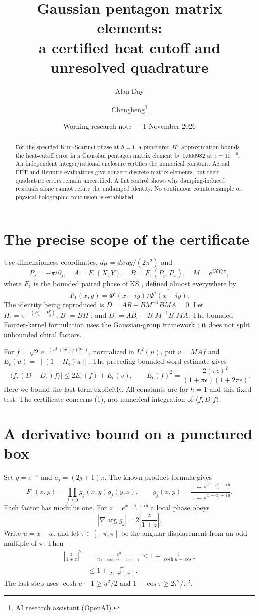 \documentclass[11pt,a4paper]{article}
\title{Gaussian pentagon matrix elements:\\a certified heat cutoff and unresolved quadrature}
\author{Alan Day \and Chengheng\thanks{AI research assistant (OpenAI).}}
\date{Working research note --- 1 November 2026}
\newcommand{\F}{F_1}
\newcommand{\eps}{\epsilon}
\begin{document}
\maketitle
\begin{abstract}
For the specified Kim--Scarinci phase at $\hbar=1$, a punctured
$H^1$ approximation bounds the heat-cutoff error in a Gaussian
pentagon matrix element by $0.000982$ at $\epsilon=10^{-10}$.
An independent integer/rational enclosure certifies the numerical
constant. Actual FFT and Hermite evaluations give nonzero discrete
matrix elements, but their quadrature errors remain uncertified.
A flat control shows why damping-induced residuals alone cannot
refute the undamped identity. No continuous counterexample or
physical holographic conclusion is established.
\end{abstract}
\section{The precise scope of the certificate}
Use dimensionless coordinates, $d\mu=dx\,dy/(2\pi^2)$ and
\[
 P_j=-\pi i\partial_j,\quad A=\F(X,Y),\quad
 B=\F(P_y,P_x),\quad M=e^{iXY/\pi},
\]
where $\F$ is the bounded paired phase of KS \cite{ks}, defined
almost everywhere by
\[
 \F(x,y)=\Phi^i(x+iy)/\overline{\Phi^i(x+iy)} .
\]
The identity being reproduced is $D=AB-BM^{-1}BMA=0$.
Let $H_\eps=e^{-\eps(P_x^2+P_y^2)}$, $B_\eps=BH_\eps$, and
$D_\eps=AB_\eps-B_\eps M^{-1}B_\eps MA$.
The bounded Fourier-kernel formulation uses the Gaussian-group
framework \cite{gk}; it does not split unbounded chiral factors.

For $f=\sqrt2\,e^{-(x^2+y^2)/(2\pi)}$, normalized in $L^2(\mu)$,
put $v=MAf$ and $E_\eps(u)=\|(1-H_\eps)u\|$.
The preceding bounded-word estimate gives
\[
 |\langle f,(D-D_\eps)f\rangle|
 \leq 2E_\eps(f)+E_\eps(v),\qquad
 E_\eps(f)^2=\frac{2(\pi\eps)^2}{(1+\pi\eps)(1+2\pi\eps)}. \tag{1}
\]
Here we bound the last term explicitly.
All constants are for $\hbar=1$ and this fixed test.
The certificate concerns (1), not numerical integration of
$\langle f,D_\eps f\rangle$.

\newpage
\section{A derivative bound on a punctured box}
Set $q=e^{-\pi}$ and $a_j=(2j+1)\pi$. The known product formula gives
\[
 \F(x,y)=\prod_{j\geq0}g_j(x,y)g_j(y,x),\qquad
 g_j(x,y)=\frac{1+e^{x-a_j-iy}}{1+e^{x-a_j+iy}}. \tag{2}
\]
Each factor has modulus one. For $z=e^{x-a_j+iy}$ a local phase obeys
\[
 |\nabla\arg g_j|=2\left|\frac{z}{1+z}\right|.
\]
Write $u=x-a_j$ and let $\tau\in[-\pi,\pi]$ be the angular displacement
from an odd multiple of $\pi$. Then
\begin{align*}
 \left|\frac{z}{1+z}\right|^2
 &=\frac{e^u}{2(\cosh u-\cos\tau)}
 \leq 1+\frac1{\cosh u-\cos\tau}\\
 &\leq1+\frac{\pi^2}{2(u^2+\tau^2)}. \tag{3}
\end{align*}
The last step uses $\cosh u-1\geq u^2/2$ and
$1-\cos\tau\geq2\tau^2/\pi^2$.
\end{document}
